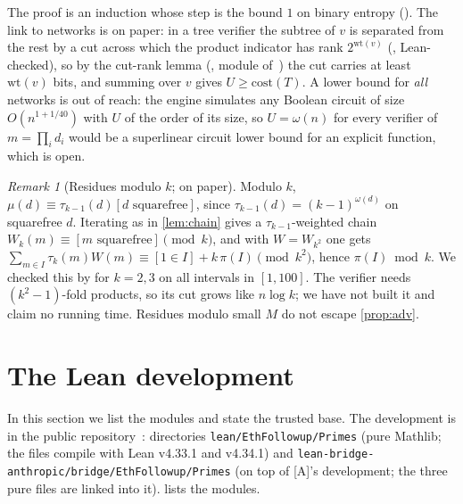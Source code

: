 \documentclass[10pt]{amsart}
\theoremstyle{plain}
\theoremstyle{definition}
\theoremstyle{remark}
\newtheorem{remark}[theorem]{Remark}
\numberwithin{equation}{section}
\newcommand{\A}{\textup{[A]}}
\begin{document}
\noindent The proof is an induction whose step is the bound $1$ on binary entropy
(). The link to networks is on paper: in a tree verifier the subtree of
$v$ is separated from the rest by a cut across which the product indicator has rank $2^{\mathrm{wt}(v)}$
(, Lean-checked), so by the cut-rank lemma
(, module  of~\cite{TulsyanRepo26}) the cut carries at least $\mathrm{wt}(v)$ bits, and summing over $v$ gives
$U\ge\mathrm{cost}(T)$. A lower bound for \emph{all} networks is out of reach: the engine simulates any
Boolean circuit of size $O(n^{1+1/40})$ with $U$ of the order of its size, so $U=\omega(n)$ for every
verifier of $m=\prod_id_i$ would be a superlinear circuit lower bound for an explicit function, which is
open.

\begin{remark}[Residues modulo $k$; on paper]\label{rem:modk}
Modulo $k$, $\mu(d)\equiv\tau_{k-1}(d)[d\text{ squarefree}]$, since $\tau_{k-1}(d)=(k-1)^{\omega(d)}$ on
squarefree $d$. Iterating as in \cref{lem:chain} gives a $\tau_{k-1}$-weighted chain $W_k(m)\equiv
[m\text{ squarefree}]\pmod k$, and with $W=W_{k^2}$ one gets
$\sum_{m\in I}\tau_k(m)W(m)\equiv[1\in I]+k\,\pi(I)\pmod{k^2}$, hence $\pi(I)\bmod k$. We checked this
by  for $k=2,3$ on all intervals in $[1,100]$. The verifier needs $(k^2-1)$-fold products,
so its cut grows like $n\log k$; we have not built it and claim no running time. Residues modulo
small $M$ do not escape \cref{prop:adv}.
\end{remark}

\section{The Lean development}\label{sec:formal}

In this section we list the modules and state the trusted base. The development is in the public
repository~\cite{TulsyanRepo26}: directories \texttt{lean/EthFollowup/Primes} (pure Mathlib; the files
compile with Lean v4.33.1 and v4.34.1) and \texttt{lean-bridge-anthropic/bridge/EthFollowup/Primes} (on top
of \A's development; the three pure files are linked into it).  lists the modules.
\end{document}
